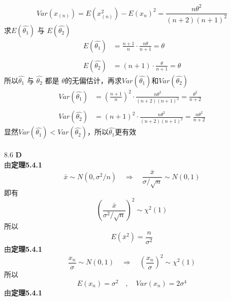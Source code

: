 \documentclass[a4paper]{ctexart}    %
\begin{document}
	\begin{equation*}
		Var(x_{(n)}) = E(x_{(n)}^2) - E(x_{n})^2 = \frac{n\theta^2}{(n+2)(n+1)^2}
	\end{equation*}
	求$ E(\hat{\theta_1}) $ 与 $ E(\hat{\theta_2}) $
	\begin{equation*}
		\begin{split}
			E(\hat{\theta_1}) &= \frac{n+1}{n} \cdot \frac{n\theta}{n+1} = \theta \\
			&\\
			E(\hat{\theta_2}) &= (n+1) \cdot \frac{\theta}{n+1} = \theta
		\end{split}
	\end{equation*}
	所以$ \hat{\theta_1} $ 与 $ \hat{\theta_2} $ 都是 $ \theta $的无偏估计，再求$ Var(\hat{\theta_1}) $和$ Var(\hat{\theta_2}) $
	\begin{equation*}
		\begin{split}
			Var(\hat{\theta_1}) &= \left(\frac{n+1}{n}\right)^2 \cdot \frac{n\theta^2}{(n+2)(n+1)^2} = \frac{\theta^2}{n+2} \\
			\\
			Var(\hat{\theta_2}) &= (n+1)^2 \cdot \frac{n\theta^2}{(n+2)(n+1)^2} = \frac{n\theta^2}{n+2}
		\end{split}
	\end{equation*}
	显然$ Var(\hat{\theta_1}) < Var(\hat{\theta_2})$，所以$ \hat{\theta_1} $更有效 \\ \\
	8.6 \quad \textbf{D} \\
	由\textbf{定理5.4.1}
	\begin{equation*}
		\bar{x} \sim N(0, \sigma^2 / n) \quad \Rightarrow \quad \frac{\bar{x}}{\sigma / \sqrt{n}} \sim N(0, 1)
	\end{equation*}
	即有
	\begin{equation*}
		\left(\frac{\bar{x}}{\sigma^2 / \sqrt{n}}\right)^2 \sim \chi^2(1)
	\end{equation*}
	所以
	\begin{equation*}
		E(\bar{x}^2) = \frac{n}{\sigma^2}
	\end{equation*}
	由\textbf{定理5.4.1}
	\begin{equation*}
		\frac{x_n}{\sigma} \sim N(0, 1) \quad \Rightarrow \quad \left(\frac{x_n}{\sigma}\right)^2 \sim \chi^2(1)
	\end{equation*}
	所以
	\begin{equation*}
		E(x_n) = \sigma^2 \quad , \quad Var(x_n) = 2 \sigma^4
	\end{equation*}
	由\textbf{定理5.4.1}
\end{document}
